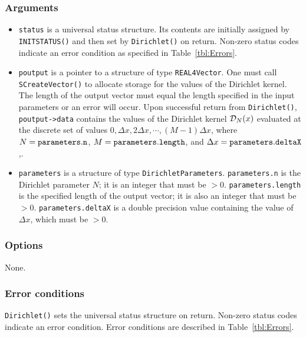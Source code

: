 \documentclass{article}
\begin{document}
\subsubsection{Arguments}


\begin{itemize}
\item 
{\tt status\/} is a universal status structure. 
Its contents are initially assigned by {\tt INITSTATUS()\/} and then 
set by {\tt Dirichlet()\/} on return. 
Non-zero status codes indicate an error condition as specified in 
Table~\ref{tbl:Errors}.
\item 
{\tt poutput\/} is a pointer to a structure of type {\tt REAL4Vector}. 
One must call {\tt SCreateVector()\/} to allocate storage for the
values of the Dirichlet kernel.
The length of the output vector must equal the length specified in 
the input parameters or an error will occur.
Upon successful return from {\tt Dirichlet()\/}, {\tt poutput->data\/}
contains the values of the Dirichlet kernel ${\cal D}_N(x)$ evaluated 
at the discrete set of values 
$0, \Delta x, 2\Delta x, \cdots, (M-1)\Delta x$,
where $N={\tt parameters.n\/}$, $M={\tt parameters.length\/}$,
and $\Delta x={\tt parameters.deltaX\/}$,.
\item 
{\tt parameters\/} is a structure of type {\tt DirichletParameters\/}.  
{\tt parameters.n\/} is the Dirichlet parameter $N$;
it is an integer that must be $> 0$.
{\tt parameters.length\/} is the specified length of the output vector;
it is also an integer that must be $> 0$.
{\tt parameters.deltaX\/} is a double precision value containing the
value of $\Delta x$, which must be $>0$.

\end{itemize}

\subsubsection{Options}

None.

\subsubsection{Error conditions}


{\tt Dirichlet()\/} sets the universal status structure on return. 
Non-zero status codes indicate an error condition. 
Error conditions are described in Table~\ref{tbl:Errors}.
\end{document}
